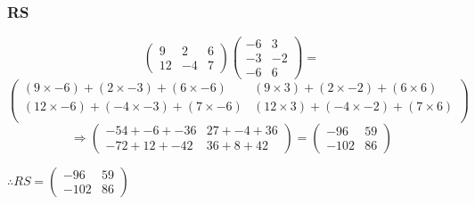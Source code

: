 \documentclass{article}
\begin{document}
\subsubsection{RS}
\[
	\begin{pmatrix}
		9 & 2 & 6\\
		12 & -4 & 7
	\end{pmatrix}
	\begin{pmatrix}
		-6 & 3\\
		-3 & -2\\
		-6 & 6
	\end{pmatrix}
	=
\]
\[
	\begin{pmatrix}
		(9\times-6)+(2\times-3)+(6\times-6) & (9\times3)+(2\times-2)+(6\times6)\\
		(12\times-6)+(-4\times-3)+(7\times-6) & (12\times3)+(-4\times-2)+(7\times6)\\
	\end{pmatrix}
\]
\[
	\Rightarrow
	\begin{pmatrix}
		-54+-6+-36 & 27+-4+36\\
		-72+12+-42 & 36+8+42
	\end{pmatrix}
	=
	\begin{pmatrix}
		-96 & 59\\
		-102 & 86
	\end{pmatrix}
\]
\begin{center}\vspace{0.5cm}$\therefore
	RS=
	\begin{pmatrix}
		-96 & 59\\
		-102 & 86
	\end{pmatrix}
$\end{center}
\end{document}
